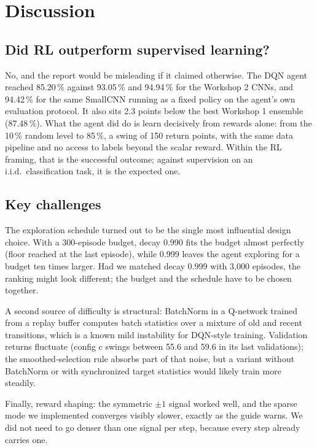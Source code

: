 \documentclass[11pt,a4paper]{article}
\begin{document}
\section{Discussion}

\subsection{Did RL outperform supervised learning?}

No, and the report would be misleading if it claimed otherwise. The DQN agent reached 85.20\,\% against 93.05\,\% and 94.94\,\% for the Workshop 2 CNNs, and 94.42\,\% for the same SmallCNN running as a fixed policy on the agent's own evaluation protocol. It also sits 2.3 points below the best Workshop 1 ensemble (87.48\,\%). What the agent did do is learn decisively from rewards alone: from the 10\,\% random level to 85\,\%, a swing of 150 return points, with the same data pipeline and no access to labels beyond the scalar reward. Within the RL framing, that is the successful outcome; against supervision on an i.i.d.\ classification task, it is the expected one.

\subsection{Key challenges}

The exploration schedule turned out to be the single most influential design choice. With a 300-episode budget, decay 0.990 fits the budget almost perfectly (floor reached at the last episode), while 0.999 leaves the agent exploring for a budget ten times larger. Had we matched decay 0.999 with 3{,}000 episodes, the ranking might look different; the budget and the schedule have to be chosen together.

A second source of difficulty is structural: BatchNorm in a Q-network trained from a replay buffer computes batch statistics over a mixture of old and recent transitions, which is a known mild instability for DQN-style training. Validation returns fluctuate (config c swings between 55.6 and 59.6 in its last validations); the smoothed-selection rule absorbs part of that noise, but a variant without BatchNorm or with synchronized target statistics would likely train more steadily.

Finally, reward shaping: the symmetric $\pm1$ signal worked well, and the sparse mode we implemented converges visibly slower, exactly as the guide warns. We did not need to go denser than one signal per step, because every step already carries one.
\end{document}
